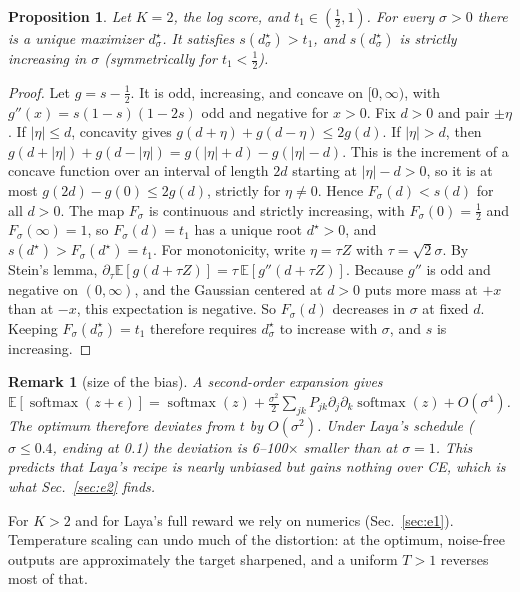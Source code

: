 \documentclass[conference]{IEEEtran}
\newtheorem{proposition}{Proposition}
\newtheorem{remark}{Remark}
\DeclareMathOperator{\softmax}{softmax}
\newcommand{\E}{\mathbb{E}}
\begin{document}
\begin{proposition}
\label{prop:binary}
Let $K=2$, the log score, and $t_1\in(\tfrac12,1)$. For every $\sigma>0$
there is a unique maximizer $d^\star_\sigma$. It satisfies
$s(d^\star_\sigma)>t_1$, and $s(d^\star_\sigma)$ is strictly increasing in
$\sigma$ (symmetrically for $t_1<\tfrac12$).
\end{proposition}

\begin{proof}
Let $g=s-\tfrac12$. It is odd, increasing, and concave on $[0,\infty)$,
with $g''(x)=s(1-s)(1-2s)$ odd and negative for $x>0$. Fix $d>0$ and pair
$\pm\eta$. If $|\eta|\le d$, concavity gives
$g(d+\eta)+g(d-\eta)\le 2g(d)$. If $|\eta|>d$, then
$g(d+|\eta|)+g(d-|\eta|)=g(|\eta|+d)-g(|\eta|-d)$. This is the increment
of a concave function over an interval of length $2d$ starting at
$|\eta|-d>0$, so it is at most $g(2d)-g(0)\le 2g(d)$, strictly for
$\eta\neq0$. Hence $F_\sigma(d)<s(d)$ for all $d>0$. The map $F_\sigma$ is
continuous and strictly increasing, with $F_\sigma(0)=\tfrac12$ and
$F_\sigma(\infty)=1$, so $F_\sigma(d)=t_1$ has a unique root $d^\star>0$,
and $s(d^\star)>F_\sigma(d^\star)=t_1$. For monotonicity, write
$\eta=\tau Z$ with $\tau=\sqrt2\sigma$. By Stein's lemma,
$\partial_\tau\E[g(d+\tau Z)]=\tau\,\E[g''(d+\tau Z)]$. Because $g''$ is odd
and negative on $(0,\infty)$, and the Gaussian centered at $d>0$ puts more
mass at $+x$ than at $-x$, this expectation is negative. So $F_\sigma(d)$
decreases in $\sigma$ at fixed $d$. Keeping $F_\sigma(d^\star_\sigma)=t_1$
therefore requires $d^\star_\sigma$ to increase with $\sigma$, and $s$ is
increasing.
\end{proof}

\begin{remark}[size of the bias]
A second-order expansion gives
$\E[\softmax(z+\epsilon)]=\softmax(z)+\tfrac{\sigma^2}{2}\sum_{jk}P_{jk}\partial_j\partial_k\softmax(z)+O(\sigma^4)$.
The optimum therefore deviates from $t$ by $O(\sigma^2)$. Under Laya's
schedule ($\sigma\le0.4$, ending at 0.1) the deviation is 6--100$\times$
smaller than at $\sigma=1$. This predicts that Laya's recipe is nearly
unbiased but gains nothing over CE, which is what Sec.~\ref{sec:e2}
finds.
\end{remark}

For $K>2$ and for Laya's full reward we rely on numerics
(Sec.~\ref{sec:e1}). Temperature scaling can undo much of the distortion: at
the optimum, noise-free outputs are approximately the target sharpened, and a
uniform $T>1$ reverses most of that.
\end{document}
